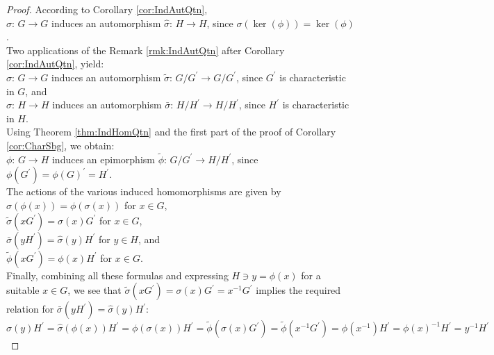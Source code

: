 \documentclass{amsart}
\theoremstyle{definition}
\numberwithin{equation}{section}
\begin{document}
\begin{proof}
According to Corollary
\ref{cor:IndAutQtn},\\
\(\sigma:\,G\to G\) induces an automorphism \(\hat{\sigma}:\,H\to H\),
since \(\sigma(\ker(\phi))=\ker(\phi)\).\\
Two applications of the Remark
\ref{rmk:IndAutQtn}
after Corollary
\ref{cor:IndAutQtn},
yield:\\
\(\sigma:\,G\to G\) induces an automorphism \(\tilde{\sigma}:\,G/G^\prime\to G/G^\prime\),
since \(G^\prime\) is characteristic in \(G\), and\\
\(\hat{\sigma}:\,H\to H\) induces an automorphism \(\bar{\sigma}:\,H/H^\prime\to H/H^\prime\),
since \(H^\prime\) is characteristic in \(H\).\\
Using Theorem
\ref{thm:IndHomQtn}
and the first part of the proof of Corollary
\ref{cor:CharSbg},
we obtain:\\
\(\phi:\,G\to H\) induces an epimorphism \(\tilde{\phi}:\,G/G^\prime\to H/H^\prime\),
since \(\phi(G^\prime)=\phi(G)^\prime=H^\prime\).\\
The actions of the various induced homomorphisms are given by\\
\(\hat{\sigma}(\phi(x))=\phi(\sigma(x))\) for \(x\in G\),\\
\(\tilde{\sigma}(xG^\prime)=\sigma(x)G^\prime\) for \(x\in G\),\\
\(\bar{\sigma}(yH^\prime)=\hat{\sigma}(y)H^\prime\) for \(y\in H\), and\\
\(\tilde{\phi}(xG^\prime)=\phi(x)H^\prime\) for \(x\in G\).\\
Finally, combining all these formulas and expressing \(H\ni y=\phi(x)\) for a suitable \(x\in G\),
we see that \(\tilde{\sigma}(xG^\prime)=\sigma(x)G^\prime=x^{-1}G^\prime\)
implies the required relation for \(\bar{\sigma}(yH^\prime)=\hat{\sigma}(y)H^\prime\):\\
\(\hat{\sigma}(y)H^\prime
=\hat{\sigma}(\phi(x))H^\prime
=\phi(\sigma(x))H^\prime
=\tilde{\phi}(\sigma(x)G^\prime)
=\tilde{\phi}(x^{-1}G^\prime)
=\phi(x^{-1})H^\prime
=\phi(x)^{-1}H^\prime
=y^{-1}H^\prime\)
\end{proof}
\end{document}
